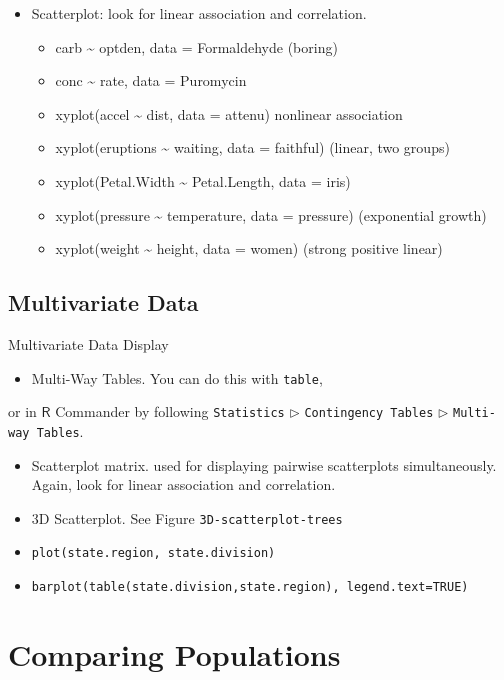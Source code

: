 \documentclass[10pt,english]{scrbook}
\begin{document}
\begin{itemize}
\item Scatterplot: look for linear association and correlation. 
\begin{itemize}
\item carb \textasciitilde{} optden, data = Formaldehyde (boring)
\item conc \textasciitilde{} rate, data = Puromycin
\item xyplot(accel \textasciitilde{} dist, data = attenu) nonlinear association
\item xyplot(eruptions \textasciitilde{} waiting, data = faithful) (linear, two groups)
\item xyplot(Petal.Width \textasciitilde{} Petal.Length, data = iris)
\item xyplot(pressure \textasciitilde{} temperature, data = pressure) (exponential growth)
\item xyplot(weight \textasciitilde{} height, data = women) (strong positive linear)
\end{itemize}
\end{itemize}
\subsection[Multivariate Data]{Multivariate Data}
\label{sec-1-5-2}

Multivariate Data Display

\begin{itemize}
\item Multi-Way Tables. You can do this with \texttt{table},
\end{itemize}
or in \(\mathsf{R}\) Commander by following \texttt{Statistics} \(\triangleright\) \texttt{Contingency Tables} \(\triangleright\) \texttt{Multi-way Tables}.
\begin{itemize}
\item Scatterplot matrix. used for displaying pairwise scatterplots simultaneously. Again, look for linear association and correlation.
\item 3D Scatterplot. See Figure \texttt{3D-scatterplot-trees}
\item \texttt{plot(state.region, state.division)}
\item \texttt{barplot(table(state.division,state.region), legend.text=TRUE)}
\end{itemize}
\section[Comparing Populations]{Comparing Populations}
\label{sec-1-6}
\end{document}
